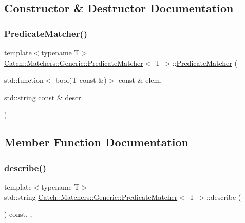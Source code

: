 \subsection{Constructor \& Destructor Documentation}
\mbox{\label{class_catch_1_1_matchers_1_1_generic_1_1_predicate_matcher_a57d53ef028c2f7b92b016f627f91aa76}} 
\subsubsection{\texorpdfstring{Predicate\+Matcher()}{PredicateMatcher()}}
{\footnotesize\ttfamily template$<$typename T$>$ \\
\mbox{\hyperlink{class_catch_1_1_matchers_1_1_generic_1_1_predicate_matcher}{Catch\+::\+Matchers\+::\+Generic\+::\+Predicate\+Matcher}}$<$ T $>$\+::\mbox{\hyperlink{class_catch_1_1_matchers_1_1_generic_1_1_predicate_matcher}{Predicate\+Matcher}} (\begin{DoxyParamCaption}\item[{std\+::function$<$ bool(T const \&)$>$ const \&}]{elem,  }\item[{std\+::string const \&}]{descr }\end{DoxyParamCaption})\hspace{0.3cm}{\ttfamily [inline]}}



\subsection{Member Function Documentation}
\mbox{\label{class_catch_1_1_matchers_1_1_generic_1_1_predicate_matcher_af7d59e94892cc09471bbaefac4c889fd}} 
\subsubsection{\texorpdfstring{describe()}{describe()}}
{\footnotesize\ttfamily template$<$typename T$>$ \\
std\+::string \mbox{\hyperlink{class_catch_1_1_matchers_1_1_generic_1_1_predicate_matcher}{Catch\+::\+Matchers\+::\+Generic\+::\+Predicate\+Matcher}}$<$ T $>$\+::describe (\begin{DoxyParamCaption}{ }\end{DoxyParamCaption}) const\hspace{0.3cm}{\ttfamily [inline]}, {\ttfamily [override]}, {\ttfamily [virtual]}}



